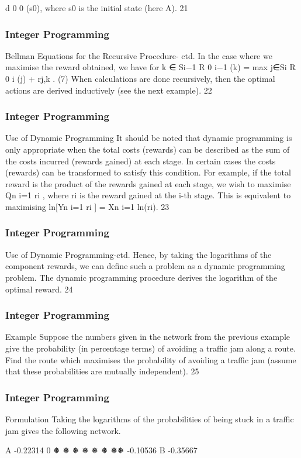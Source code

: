 \begin{frame}
d
0
0
(s0), where s0 is the initial state (here A).
21 \end{frame}  \begin{frame} \frametitle{Integer Programming}     
Bellman Equations for the Recursive Procedure- ctd.
In the case where we maximise the reward obtained, we have for
k ∈ Si−1
R
0
i−1
(k) = max
j∈Si
{R
0
i
(j) + rj,k }. (7)
When calculations are done recursively, then the optimal actions
are derived inductively (see the next example).
22 \end{frame}  \begin{frame} \frametitle{Integer Programming}     
Use of Dynamic Programming
It should be noted that dynamic programming is only appropriate
when the total costs (rewards) can be described as the sum of the
costs incurred (rewards gained) at each stage.
In certain cases the costs (rewards) can be transformed to satisfy
this condition. For example, if the total reward is the product of
the rewards gained at each stage, we wish to maximise Qn
i=1 ri
,
where ri
is the reward gained at the i-th stage.
This is equivalent to maximising
ln[Yn
i=1
ri
] = Xn
i=1
ln(ri).
23 \end{frame}  \begin{frame} \frametitle{Integer Programming}     
Use of Dynamic Programming-ctd.
Hence, by taking the logarithms of the component rewards, we can
define such a problem as a dynamic programming problem.
The dynamic programming procedure derives the logarithm of the
optimal reward.
24 \end{frame}  \begin{frame} \frametitle{Integer Programming}     
Example
Suppose the numbers given in the network from the previous
example give the probability (in percentage terms) of avoiding a
traffic jam along a route. Find the route which maximises the
probability of avoiding a traffic jam (assume that these
probabilities are mutually independent).
25 \end{frame}  \begin{frame} \frametitle{Integer Programming}     
Formulation
Taking the logarithms of the probabilities of being stuck in a traffic
jam gives the following network.







A
-0.22314
0
❅
❅
❅
❅
❅
❅
❅❅
-0.10536
B -0.35667








\end{frame}
